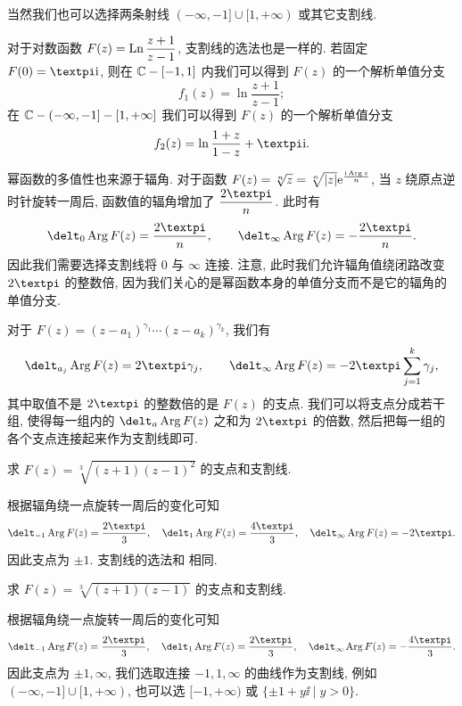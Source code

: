 当然我们也可以选择两条射线 $(-\infty,-1]\cup[1,+\infty)$ 或其它支割线.

对于对数函数 $F(z)=\operatorname{Ln}\dfrac{z+1}{z-1}$, 支割线的选法也是一样的.
若固定 $F(0)=\cpi\ii$, 则在 ${\mathbb{C}}-[-1,1]$ 内我们可以得到 $F(z)$ 的一个解析单值分支
\[
  f_1(z)=\ln\frac{z+1}{z-1};
\]
在 ${\mathbb{C}}-(-\infty,-1]-[1,+\infty]$ 我们可以得到 $F(z)$ 的一个解析单值分支
\[
  f_2(z)=\ln\frac{1+z}{1-z}+\cpi\ii.
\]

幂函数的多值性也来源于辐角.
对于函数 $F(z)=\sqrt[n]{z}=\sqrt[n]{\lvert z\rvert}\mathrm{e}^{\frac{\mathrm{i}\operatorname{Arg} z}n}$, 当 $z$ 绕原点逆时针旋转一周后, 函数值的辐角增加了 $\dfrac{2\cpi}n$.
此时有
\[
  \delt_0 \Arg F(z)=\frac{2\cpi}n,\qquad
  \delt_\infty \Arg F(z)=-\frac{2\cpi}n.
\]
因此我们需要选择支割线将 $0$ 与 $\infty$ 连接.
注意, 此时我们允许辐角值绕闭路改变 $2\cpi$ 的整数倍, 因为我们关心的是幂函数本身的单值分支而不是它的辐角的单值分支.

对于 $F(z)=(z-a_1)^{\gamma_1}\cdots(z-a_k)^{\gamma_k}$, 我们有
\[
  \delt_{a_j}\Arg F(z)=2\cpi\gamma_j,\qquad
  \delt_\infty \Arg F(z)=-2\cpi\sum_{j=1}^k\gamma_j,
\]
其中取值不是 $2\cpi$ 的整数倍的是 $F(z)$ 的支点.
我们可以将支点分成若干组, 使得每一组内的 $\delt_a\Arg F(z)$ 之和为 $2\cpi$ 的倍数, 然后把每一组的各个支点连接起来作为支割线即可.

\begin{example}
  求 $F(z)=\sqrt[3]{(z+1)(z-1)^2}$ 的支点和支割线.
\end{example}

\begin{solution}
  根据辐角绕一点旋转一周后的变化可知
  \[
    \delt_{-1} \Arg F(z)=\frac{2\cpi}3,\quad
    \delt_1 \Arg F(z)=\frac{4\cpi}3,\quad
    \delt_\infty \Arg F(z)=-2\cpi.
  \]
  因此支点为 $\pm1$.
  支割线的选法和 相同.
\end{solution}

\begin{example}
  求 $F(z)=\sqrt[3]{(z+1)(z-1)}$ 的支点和支割线.
\end{example}

\begin{solution}
  根据辐角绕一点旋转一周后的变化可知
  \[
    \delt_{-1} \Arg F(z)=\frac{2\cpi}3,\quad
    \delt_1 \Arg F(z)=\frac{2\cpi}3,\quad
    \delt_\infty \Arg F(z)=-\frac{4\cpi}3.
  \]
  因此支点为 $\pm1,\infty$, 我们选取连接 $-1,1,\infty$ 的曲线作为支割线, 例如 $(-\infty,-1]\cup[1,+\infty)$, 也可以选 $[-1,+\infty)$ 或 $\{\pm1+y\ii\mid y>0\}$.
\end{solution}

